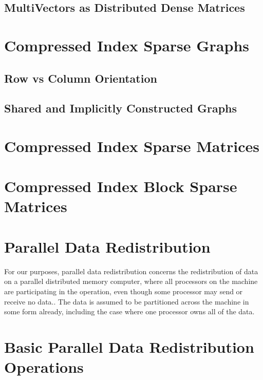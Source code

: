 \documentclass[12pt,relax]{PetraObjectModel}
\begin{document}
\subsection{MultiVectors as Distributed Dense Matrices}

\section{Compressed Index Sparse Graphs}
\subsection{Row vs Column Orientation}
\subsection{Shared and Implicitly Constructed Graphs}

\section{Compressed Index Sparse Matrices}

\section{Compressed Index Block Sparse Matrices}


\section{Parallel Data Redistribution}
For our purposes, parallel data redistribution concerns the redistribution of 
data on a parallel distributed memory computer, where all processors on the 
machine are participating in the operation, even though some processor may send
or receive no data..  The data is assumed to be 
partitioned across the machine in some form already, including the case where one
processor owns all of the data.


\section{Basic Parallel Data Redistribution Operations}
\end{document}
